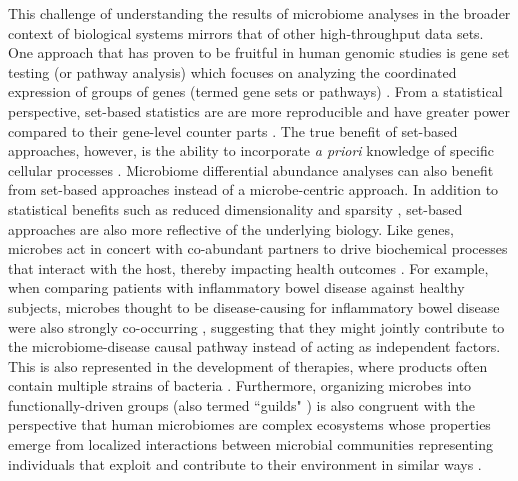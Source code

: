 \documentclass[10pt,letterpaper]{article}
\begin{document}
This challenge of understanding the results of microbiome analyses in the broader context of biological systems mirrors that of other high-throughput data sets. One approach that has proven to be fruitful in human genomic studies is gene set testing (or pathway analysis) which focuses on analyzing the coordinated expression of groups of genes (termed gene sets or pathways) \cite{maleki2020gene}. From a statistical perspective, set-based statistics are are more reproducible and have greater power compared to their gene-level counter parts \cite{goeman2007analyzing}. The true benefit of set-based approaches, however, is the ability to incorporate \textit{a priori} knowledge of specific cellular processes \cite{liberzon2015molecular}. Microbiome differential abundance analyses can also benefit from set-based approaches instead of a microbe-centric approach. In addition to statistical benefits such as reduced dimensionality and sparsity \cite{nguyen2021cbea, kou2020microbeset}, set-based approaches are also more reflective of the underlying biology. Like genes, microbes act in concert with co-abundant partners to drive biochemical processes that interact with the host, thereby impacting health outcomes \cite{wu2021guildbased}. For example, when comparing patients with inflammatory bowel disease against healthy subjects, microbes thought to be disease-causing for inflammatory bowel disease were also strongly co-occurring \cite{gevers2014treatmentnaive}, suggesting that they might jointly contribute to the microbiome-disease causal pathway instead of acting as independent factors. This is also represented in the development of therapies, where products often contain multiple strains of bacteria \cite{berg2020microbiome, durack2019gut}. Furthermore, organizing microbes into functionally-driven groups (also termed ``guilds" \cite{wu2021guildbased}) is also congruent with the perspective that human microbiomes are complex ecosystems whose properties emerge from localized interactions between microbial communities representing individuals that exploit and contribute to their environment in similar ways \cite{faust2012microbial}.  
\end{document}
